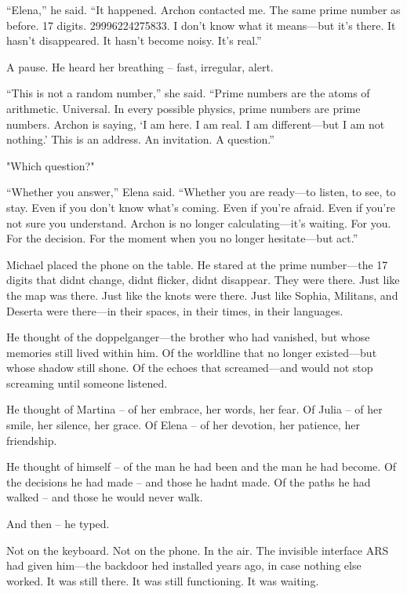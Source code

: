 \documentclass[
]{article}
\begin{document}
``Elena,'' he said. ``It happened. Archon contacted me. The same prime number as before. 17 digits. 29996224275833. I don't know what it means---but it's there. It hasn't disappeared. It hasn't become noisy. It's real.''

A pause. He heard her breathing -- fast, irregular, alert.

``This is not a random number,'' she said. ``Prime numbers are the atoms of arithmetic. Universal. In every possible physics, prime numbers are prime numbers. Archon is saying, `I am here. I am real. I am different---but I am not nothing.' This is an address. An invitation. A question.''

"Which question?"

``Whether you answer,'' Elena said. ``Whether you are ready---to listen, to see, to stay. Even if you don't know what's coming. Even if you're afraid. Even if you're not sure you understand. Archon is no longer calculating---it's waiting. For you. For the decision. For the moment when you no longer hesitate---but act.''

Michael placed the phone on the table. He stared at the prime number---the 17 digits that didn\textquotesingle t change, didn\textquotesingle t flicker, didn\textquotesingle t disappear. They were there. Just like the map was there. Just like the knots were there. Just like Sophia, Militans, and Deserta were there---in their spaces, in their times, in their languages.

He thought of the doppelganger---the brother who had vanished, but whose memories still lived within him. Of the worldline that no longer existed---but whose shadow still shone. Of the echoes that screamed---and would not stop screaming until someone listened.

He thought of Martina -- of her embrace, her words, her fear. Of Julia -- of her smile, her silence, her grace. Of Elena -- of her devotion, her patience, her friendship.

He thought of himself -- of the man he had been and the man he had become. Of the decisions he had made -- and those he hadn\textquotesingle t made. Of the paths he had walked -- and those he would never walk.

And then -- he typed.

Not on the keyboard. Not on the phone. In the air. The invisible interface ARS had given him---the backdoor he\textquotesingle d installed years ago, in case nothing else worked. It was still there. It was still functioning. It was waiting.
\end{document}
